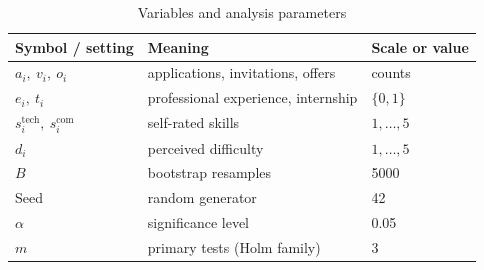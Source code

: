 \documentclass[conference]{IEEEtran}
\begin{document}
\begin{table}[t]
\centering
\caption{Variables and analysis parameters}
\label{tab:params}
\begin{tabular}{@{}lll@{}}
\toprule
Symbol / setting & Meaning & Scale or value \\
\midrule
$a_i,\ v_i,\ o_i$ & applications, invitations, offers & counts \\
$e_i,\ t_i$ & professional experience, internship & $\{0,1\}$ \\
$s_i^{\mathrm{tech}},\ s_i^{\mathrm{com}}$ & self-rated skills & $1,\dots,5$ \\
$d_i$ & perceived difficulty & $1,\dots,5$ \\
$B$ & bootstrap resamples & 5000 \\
Seed & random generator & 42 \\
$\alpha$ & significance level & 0.05 \\
$m$ & primary tests (Holm family) & 3 \\
\bottomrule
\end{tabular}
\end{table}
\end{document}
